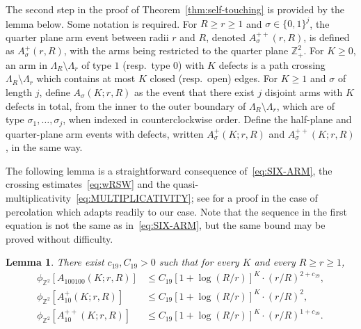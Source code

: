\documentclass[a4paper,oneside,11pt]{article}
\newtheorem{lemma}[theorem]{Lemma}
\numberwithin{equation}{section}
\numberwithin{equation}{section}
\numberwithin{equation}{section}
\newcommand{\bbZ}{\mathbb{Z}}
\begin{document}
The second step in the proof of Theorem~\ref{thm:self-touching} is provided by the lemma below. Some notation is required. 
For $R\ge r\ge1$ and $\sigma \in \{0,1\}^j$, the quarter plane arm event between radii $r$ and $R$, denoted $A_{\sigma}^{++}(r,R)$, 
is defined as $A_{\sigma}^+(r,R)$, with the arms being restricted to the quarter plane $\bbZ_+^2$.
For $K\geq 0$, an arm in $\Lambda_R\setminus\Lambda_r$ of type $1$ (resp.~type $0$) with $K$ defects 
is a path crossing $\Lambda_R\setminus\Lambda_r$ which contains at most $K$ closed (resp.~open) edges. 
For $K\geq 1$ and $\sigma$ of length $j$, define $A_{\sigma}(K;r,R)$ as the event that there exist 
$j$ disjoint arms with $K$ defects in total, from the inner to the outer boundary of $\Lambda_R\setminus\Lambda_r$, 
which are of type $\sigma_1,\dots, \sigma_j$, when indexed in counterclockwise order.
Define the half-plane and quarter-plane arm events with defects, written $A^+_\sigma(K;r,R)$ and $A^{++}_\sigma(K;r,R)$, in the same way.

The following lemma is a straightforward consequence of~\eqref{eq:SIX-ARM}, 
the crossing estimates~\eqref{eq:wRSW} and the quasi-multiplicativity~\eqref{eq:MULTIPLICATIVITY};
see \cite[Prop.~17]{Nol08} for a proof in the case of percolation which adapts readily to our case. 
Note that the sequence in the first equation is not the same as in~\eqref{eq:SIX-ARM}, but the same bound may be proved without difficulty.
	
\begin{lemma}\label{lem:arm_defects}
	There exist $c_{19},C_{19}>0$ such that for every $K$ and every $R\ge r\ge1$, 
	\begin{align*}
		\phi_{\bbZ^2}[A_{100100}(K;r,R)]  & \leq C_{19}[1 + \log(R/r)]^K \cdot (r/R)^{2+c_{19}},\\
		\phi_{\bbZ^2}[A_{10}^+(K;r,R)] 	  & \leq C_{19}[1 + \log(R/r)]^K \cdot (r/R)^2,\\
		\phi_{\bbZ^2}[A_{10}^{++}(K;r,R)] & \leq C_{19}[1 + \log(R/r)]^K \cdot (r/R)^{1+c_{19}}.
	\end{align*}
\end{lemma}
\end{document}
